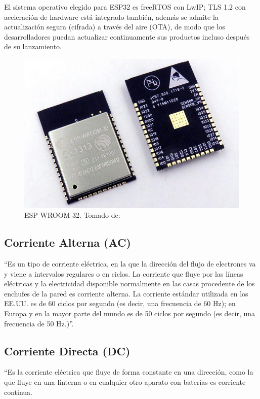 El sistema operativo elegido para ESP32 es freeRTOS con LwIP; TLS 1.2 con aceleración de hardware está integrado también, además se admite la actualización segura (cifrada) a través del aire (OTA), de modo que los desarrolladores puedan actualizar continuamente sus productos incluso después de su lanzamiento.\cite{EW32}

\begin{figure}[H]
	\centering
	\caption{ESP WROOM 32. Tomado de: \cite{ESPIMG}}
	\label{fig:esp32-wroom-s32-00}
	\includegraphics{Imagenes/esp32-wroom-s32-00}
\end{figure}

\subsection{Corriente Alterna (AC)}

``Es un tipo de corriente eléctrica, en la que la dirección del flujo de electrones va y viene a intervalos regulares o en ciclos. La corriente que fluye por las líneas eléctricas y la electricidad disponible normalmente en las casas procedente de los enchufes de la pared es corriente alterna. La corriente estándar utilizada en los EE.UU. es de 60 ciclos por segundo (es decir, una frecuencia de 60 Hz); en Europa y en la mayor parte del mundo es de 50 ciclos por segundo (es decir, una frecuencia de 50 Hz.)''. \cite{Cor}

\subsection{Corriente Directa (DC)}

``Es la corriente eléctrica que fluye de forma constante en una dirección, como la que fluye en una linterna o en cualquier otro aparato con baterías es corriente continua.

